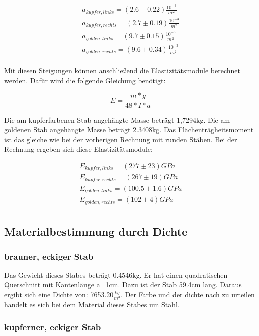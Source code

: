 \begin{align*}
    a_{kupfer, links} = (2.6\pm 0.22) \frac{10^{-3}}{m^2}\\
    a_{kupfer, rechts} = (2.7\pm 0.19) \frac{10^{-3}}{m^2}\\
    a_{golden, links} = (9.7\pm 0.15) \frac{10^{-3}}{m^2}\\
    a_{golden, rechts} = (9.6\pm 0.34) \frac{10^{-3}}{m^2}\\
\end{align*}

Mit diesen Steigungen können anschließend die Elastizitätsmodule berechnet werden. Dafür wird die folgende Gleichung benötigt:

\begin{displaymath}
    E = \frac{m*g}{48*I*a}
\end{displaymath}

Die am kupferfarbenen Stab angehängte Masse beträgt 1,7294kg. Die am goldenen Stab angehängte Masse beträgt 2.3408kg. Das Flächenträgheitsmoment ist das gleiche wie bei der vorherigen Rechnung mit runden Stäben. Bei der Rechnung ergeben sich diese Elastizitätsmodule: 

\begin{align*}
    E_{kupfer, links} = (277\pm 23)GPa\\
    E_{kupfer, rechts} = (267\pm 19)GPa\\
    E_{golden, links} = (100.5\pm 1.6)GPa\\
    E_{golden, rechts} = (102\pm 4)GPa\\
\end{align*}

\subsection{Materialbestimmung durch Dichte}

\subsubsection{brauner, eckiger Stab}

Das Gewicht dieses Stabes beträgt 0.4546kg. Er hat einen quadratischen Querschnitt mit Kantenlänge a=1cm. Dazu ist der Stab 59.4cm lang. Daraus ergibt sich eine Dichte von: 7653.20$\frac{kg}{m^3}$.
Der Farbe und der dichte nach zu urteilen handelt es sich bei dem Material dieses Stabes um Stahl.

\subsubsection{kupferner, eckiger Stab}

